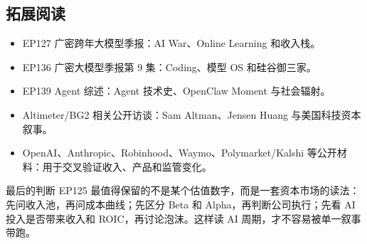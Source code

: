 \subsection{拓展阅读}

\begin{itemize}
\item EP127 广密跨年大模型季报：AI War、Online Learning 和收入栈。
\item EP136 广密大模型季报第 9 集：Coding、模型 OS 和硅谷御三家。
\item EP139 Agent 综述：Agent 技术史、OpenClaw Moment 与社会辐射。
\item Altimeter/BG2 相关公开访谈：Sam Altman、Jensen Huang 与美国科技资本叙事。
\item OpenAI、Anthropic、Robinhood、Waymo、Polymarket/Kalshi 等公开材料：用于交叉验证收入、产品和监管变化。
\end{itemize}

\begin{importantbox}{最后的判断}
EP125 最值得保留的不是某个估值数字，而是一套资本市场的读法：先问收入池，再问成本曲线；先区分 Beta 和 Alpha，再判断公司执行；先看 AI 投入是否带来收入和 ROIC，再讨论泡沫。这样读 AI 周期，才不容易被单一叙事带跑。
\end{importantbox}


